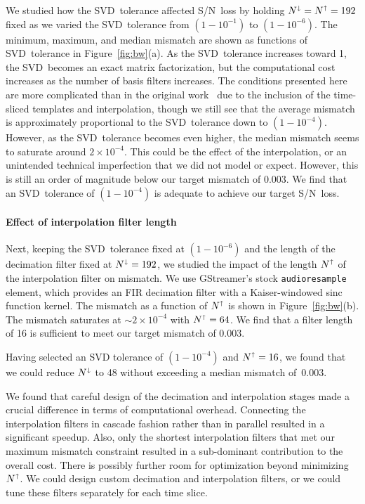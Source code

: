\documentclass[preprint2]{aastex}
\newcommand{\SNR}{S/N}%
\newcommand{\SVD}{SVD}%
\begin{document}
We studied how the \SVD\ tolerance affected \SNR\ loss by holding
$N^\shortdownarrow = N^\shortuparrow = 192$ fixed as we varied the \SVD\
tolerance from $\left(1-10^{-1}\right)$ to $\left(1-10^{-6}\right)$.  The
minimum, maximum, and median mismatch are shown as functions of \SVD\ tolerance
in Figure~\ref{fig:bw}(a).  As the \SVD\ tolerance increases toward 1, the \SVD\
becomes an exact matrix factorization, but the computational cost increases as
the number of basis filters increases.  The conditions presented here are more
complicated than in the original work~\citep{Cannon:2010p10398} due to the
inclusion of the time-sliced templates and interpolation, though we still see
that the average mismatch is approximately proportional to the \SVD\ tolerance
down to $\left(1-10^{-4}\right)$.  However, as the \SVD\ tolerance becomes even
higher, the median mismatch seems to saturate around $2 \times 10^{-4}$.  This
could be the effect of the interpolation, or an unintended technical
imperfection that we did not model or expect.  However, this is still an order
of magnitude below our target mismatch of 0.003.  We find that an \SVD\
tolerance of $\left(1-10^{-4}\right)$ is adequate to achieve our target \SNR\
loss.

\paragraph{Effect of interpolation filter length}

Next, keeping the \SVD\ tolerance fixed at $\left(1-10^{-6}\right)$ and the
length of the decimation filter fixed at $N^\shortdownarrow = 192$, we studied
the impact of the length $N^\shortuparrow$ of the interpolation filter on
mismatch.  We use GStreamer's stock
\texttt{audioresample} element, which provides an FIR decimation filter with
a Kaiser-windowed sinc function kernel.  The mismatch as a function of $N^\shortuparrow$ is shown in
Figure~\ref{fig:bw}(b).  The mismatch saturates at $\sim$$2 \times 10^{-4}$ with
$N^\shortuparrow = 64$.  We find that a filter length of 16 is sufficient to
meet our target mismatch of 0.003.

Having selected an SVD tolerance of $\left(1-10^{-4}\right)$ and
$N^\shortuparrow=16$, we found that we could reduce $N^\shortdownarrow$ to 48
without exceeding a median mismatch of~0.003.

We found that careful design of the decimation and interpolation stages made a
crucial difference in terms of computational overhead.  Connecting the
interpolation filters in cascade fashion rather than in parallel resulted in a
significant speedup.  Also, only the shortest interpolation filters that met our
maximum mismatch constraint resulted in a sub-dominant contribution to the
overall cost.  There is possibly further room for optimization beyond minimizing
$N^\shortuparrow$.  We could design custom decimation and interpolation filters,
or we could tune these filters separately for each time slice.
\end{document}
